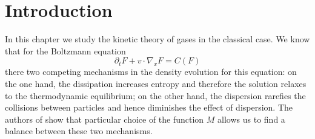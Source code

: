 

\section{Introduction} %
\label{sec:introduction}
In this chapter we study the kinetic theory of gases in the classical case. We know that for the Boltzmann equation 
\[\partial_t F + v\cdot \nabla_x F = C(F)\]
there two competing mechanisms in the density evolution for this equation: on the one hand, the dissipation increases entropy and therefore the solution relaxes to the thermodynamic equilibrium; on the other hand, the dispersion rarefies the collisions between particles and hence diminishes the effect of dispersion. The authors of \cite{FG} show that particular choice of the function $M$ allows us to find a balance between these two mechanisms.

